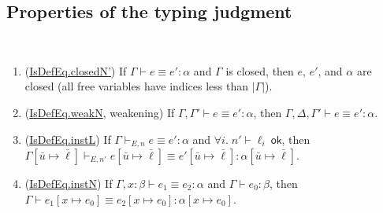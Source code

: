 \documentclass[sigplan,10pt,screen]{acmart}\settopmatter{printfolios=true,printccs=false,printacmref=false}
\newcommand{\ok}{\ \mathsf{ok}}
\newcommand{\code}[1]{\mbox{\ttfamily\small #1}}
\begin{document}
\subsection{Properties of the typing judgment}\label{sec:typing-properties}

\begin{lemma}\label{lem:closedN}\ %
  \begin{enumerate}
    \item (\href{https://github.com/digama0/lean4lean/blob/cpp2026/Lean4Lean/Theory/Typing/Lemmas.lean#L321-L322}{\code{IsDefEq.closedN'}}) If $\Gamma\vdash e\equiv e':\alpha$ and $\Gamma$ is closed, then $e$, $e'$, and $\alpha$ are closed (all free variables have indices less than $|\Gamma|$).
    \item (\href{https://github.com/digama0/lean4lean/blob/cpp2026/Lean4Lean/Theory/Typing/Lemmas.lean#L485-L486}{\code{IsDefEq.weakN}}, weakening) If $\Gamma,\Gamma'\vdash e\equiv e':\alpha$, then $\Gamma,\Delta,\Gamma'\vdash e\equiv e':\alpha$.
    \item (\href{https://github.com/digama0/lean4lean/blob/cpp2026/Lean4Lean/Theory/Typing/Lemmas.lean#L554-L555}{\code{IsDefEq.instL}}) If $\Gamma\vdash_{E,n} e\equiv e':\alpha$ and $\forall i.\;n'\vdash \ell_i\ok$, then $\Gamma[\bar u\mapsto\bar\ell]\vdash_{E,n'} e[\bar u\mapsto\bar\ell]\equiv e'[\bar u\mapsto\bar\ell]:\alpha[\bar u\mapsto\bar\ell]$.
    \item (\href{https://github.com/digama0/lean4lean/blob/cpp2026/Lean4Lean/Theory/Typing/Lemmas.lean#L588-L589}{\code{IsDefEq.instN}}) If $\Gamma,x:\beta\vdash e_1\equiv e_2:\alpha$ and $\Gamma\vdash e_0:\beta$, then $\Gamma\vdash e_1[x\mapsto e_0]\equiv e_2[x\mapsto e_0]:\alpha[x\mapsto e_0]$.
  \end{enumerate}
\end{lemma}
\end{document}

